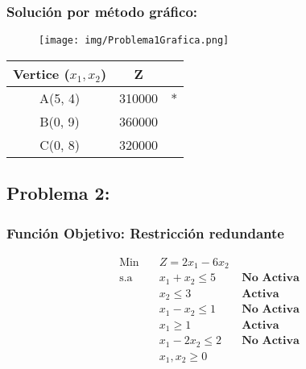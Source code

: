\documentclass{templateNote}
\begin{document}
\subsubsection*{Solución por método gráfico:}
\begin{figure}[H]
    \centering
    \texttt{[image: img/Problema1Grafica.png]}
\end{figure}
\begin{center}
    \begin{tabular}{|c|c|c|}
        \hline
        \textbf{Vertice ($x_1,x_2$)} & Z &  \\ \hline
        A(5, 4) & 310000 & * \\ \hline
        B(0, 9) & 360000 & \\ \hline
        C(0, 8) & 320000 & \\ \hline
    \end{tabular}
\end{center}

\newpage
\subsection*{Problema 2:}
\subsubsection*{Función Objetivo: Restricción redundante}
\begin{equation*}
    \begin{aligned}
        \text{Min} \quad & Z = 2x_1 - 6x_2 \\
        \text{s.a} \quad & x_1 + x_2 \leq 5 \quad &\textbf{No Activa} \\
        & x_2 \leq 3 \quad &\textbf{Activa} \\
        & x_1 - x_2 \leq 1 \quad &\textbf{No Activa} \\
        & x_1 \geq 1 \quad &\textbf{Activa} \\
        & x_1 - 2x_2 \leq 2 \quad &\textbf{No Activa} \\
        &x_1,x_2 \geq 0
    \end{aligned}
\end{equation*}
\end{document}

